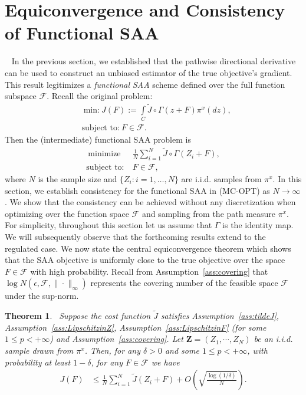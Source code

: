\documentclass[11pt,leqno]{amsart}
\newtheorem{theorem}{Theorem}
\begin{document}
\section{{Equiconvergence and Consistency of Functional SAA}}~\label{sec:equi}
In the previous section, we established that the pathwise directional derivative can be used to construct an unbiased estimator of the true objective's gradient. This result  legitimizes a \emph{functional SAA} scheme defined over the full function subspace $\mathcal{F}$. Recall the original problem:
\begin{align*}
\tag{OPT}
 &~\text{min:}~J(F) := \underset{C}\int \tilde J\circ\Gamma(z+F)\pi^x(dz),\\
\nonumber&\text{subject to:}~
F \in \mathcal F.
\end{align*}
Then the (intermediate) functional SAA problem is
\begin{align}~\tag{MC-OPT}
    \text{minimize}&~\frac{1}{N} \sum_{i=1}^N \tilde J \circ \Gamma (Z_i + F),\\
    \text{subject to:}&~F \in \mathcal F, \nonumber
\end{align}
where $N$ is the sample size and $\{Z_i : i = 1,\ldots, N\}$ are i.i.d. samples from $\pi^x$. In this section, we establish consistency for the functional SAA in (MC-OPT) as $N\rightarrow\infty$. We show that the consistency can be achieved without any discretization when optimizing over the function space $\mathcal {F} $ and sampling from the path measure $\pi^x$. For simplicity, throughout this section let us assume that $\Gamma$ is the identity map. We will subsequently observe that the forthcoming results extend to the regulated case.
We now state the central equiconvergence theorem which shows that the SAA objective is uniformly close to the true objective over the space $F\in\mathcal F$ with high probability. Recall from Assumption~\ref{ass:covering} that $\log N(\epsilon, \mathcal{F}, \|\cdot\|_\infty)$ represents the covering number of the feasible space $\mathcal{F}$ under the sup-norm.
\sloppy
\begin{theorem}~\label{thm:equiconv2}
Suppose the cost function $\tilde J$ satisfies Assumption~\ref{ass:tildeJ},  Assumption~\ref{ass:LipschitzinZ}, Assumption~\ref{ass:LipschitzinF} (for some $1 \leq p < +\infty$) and Assumption~\ref{ass:covering}. Let $\mathbf{Z} = (Z_1,\cdots,Z_N)$ be an i.i.d. sample drawn from $\pi^x$. Then, for any $\delta > 0$ and some $1 \leq p < +\infty$, with probability at least $1-\delta$, for any $F \in \mathcal{F}$ we have
\begin{align*} 
    J(F) &\leq \frac{1}{N} \sum_{i=1}^N \tilde J(Z_i+F) + O\left( \sqrt{\frac{\log(1/\delta)}{N}} \right).
\end{align*}
\end{theorem}
\end{document}
